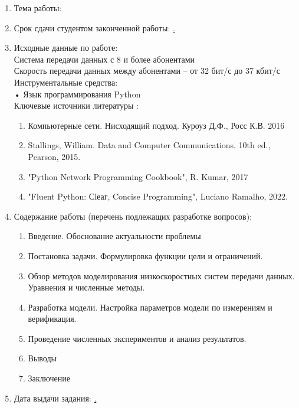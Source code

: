 \begin{enumerate}[1.]
	\item Тема работы: {\expandafter \ulined \thesisTitle}
	\item Срок сдачи студентом законченной работы: \uline{\thesisDeadline.} 
	\item Исходные данные по работе: \\
	Система передачи данных с 8 и более абонентами\\
	Скорость передачи данных между абонентами -- от 32 бит/с до 37 кбит/с\\
	Инструментальные средства: \\
	•\hspace{1cm} Язык программирования Python \\
	Ключевые источники литературы : 
	\begin{enumerate}[1.]
	\item Компьютерные сети. Нисходящий подход.  Куроуз Д.Ф., Росс К.В. 2016 
	\item Stallings, William. Data and Computer Communications. 10th ed., Pearson, 2015. 
	\item "Python Network Programming Cookbook", R. Kumar, 2017 
	\item "Fluent Python: Сlеаг, Concise Programming", Luciano Ramalho, 2022.
	\end{enumerate}
	\item Содержание работы (перечень подлежащих разработке вопросов):
	\begin{enumerate}[label=\arabic*)]
		\item Введение. Обоснование актуальности проблемы 
		\item Постановка задачи. Формулировка функции цели и ограничений. 
		\item Обзор методов моделирования низкоскоростных систем передачи данных.\\
		Уравнения и численные методы.
		\item Разработка модели. Настройка параметров модели по измерениям и\\
		верификация.
		\item Проведение численных экспериментов и анализ результатов. 
		\item Выводы
		\item Заключение
	\end{enumerate}
		\item Дата выдачи задания: \uline{\thesisStartDate.}
\end{enumerate}

